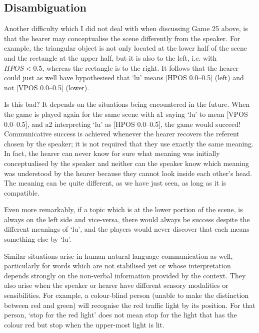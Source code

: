 \subsection{Disambiguation}

Another difficulty which I did not deal with when discussing Game 25 above,
is that the hearer may conceptualise
the scene differently from the speaker. For example, 
the triangular object is not only located at the lower half
of the scene and the rectangle at the upper half, 
but it is also to the left, i.e. with $HPOS < 0.5$, whereas
the rectangle is to the right. It follows that the 
hearer could just as well have hypothesised that `lu' means [HPOS 0.0--0.5] (left)
and not [VPOS 0.0--0.5] (lower). 

Is this bad? It depends on the situations being encountered
in the future. When the game is played again for the
same scene with {\bfshape a1} saying `lu' to mean [VPOS 0.0--0.5], and 
{\bfshape a2} interpreting `lu' as [HPOS 0.0--0.5], the game would succeed! 
Communicative success is achieved whenever the 
hearer recovers the referent chosen by the 
speaker; it is not required that they 
use exactly the same meaning. In fact, the hearer can never know
for sure what meaning was initially conceptualised by the speaker and 
neither can the speaker know which meaning was understood 
by the hearer because they cannot look inside each
other's head. The meaning can be quite different, 
as we have just seen, as long as it is compatible. 

Even more remarkably, if a topic which is at the lower
portion of the scene, is always 
on the left side and vice-versa, there would always be 
success despite the different meanings of `lu', 
and the players would never discover
that each means something else by `lu'. 

Similar situations arise in human natural language communication
as well, particularly for words
which are not stabilised yet or whose interpretation 
depends strongly on the non-verbal information provided
by the context. They also arise when the speaker or hearer
have different sensory modalities or sensibilities. 
For example, a colour-blind person (unable to 
make the distinction between red and green) will recognise
the red traffic light by its position. For that person, 
`stop for the red light' does not mean stop for 
the light that has the colour red but stop when the 
upper-most light is lit. 


